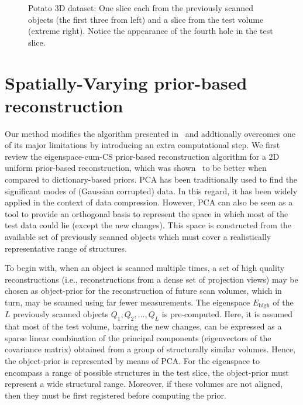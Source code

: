 \documentclass[journal]{IEEEtran}
\begin{document}
\begin{figure}[!h]
\begin{subfigure}[b]{0.235\linewidth}
\captionsetup{labelformat=empty}
\caption{}
\label{fig:potato3D_test}
     \end{subfigure}
      \caption{Potato 3D dataset: One slice each from the previously scanned objects (the first three from left) and a slice from the test 
        volume (extreme right). Notice the appearance of the fourth
        hole in the test slice. }
\label{fig:potato_dataset}
\end{figure}
\section{Spatially-Varying prior-based reconstruction}
\label{sec:method_spatially_varying_prior}
Our method modifies the algorithm presented in~\cite{my_dicta_paper}
and addtionally overcomes one of its major limitations by introducing
an extra computational step. We first review the eigenspace-cum-CS
prior-based reconstruction algorithm for a
2D uniform prior-based reconstruction, which was
shown~\cite{my_dicta_paper} to be better when compared to
dictionary-based priors. PCA has been traditionally used
to find the significant modes of (Gaussian corrupted) data. In this
regard, it has been widely applied in the context of data
compression. However, PCA can also be seen as a tool to provide an
orthogonal basis to represent the space in which most of the test data
could lie (except the new changes). This space is constructed from the
available set of previously scanned objects which must cover a
realistically representative range of structures. %

To begin with,
when an object is scanned multiple times, a set of high quality
reconstructions (i.e., reconstructions from a dense set of
projection views) may be chosen as object-prior for the reconstruction
of future scan volumes, which in turn, may be scanned using far fewer
measurements. The eigenspace $E_{\text{high}}$ of the $L$ previously
scanned objects $Q_1,Q_2,...,Q_L$ is pre-computed. Here, it is assumed
that most of the test volume, barring the new changes, can be
expressed as a sparse linear combination of the principal components
(eigenvectors of the covariance matrix) obtained from a group of
structurally similar volumes. Hence, the object-prior is represented
by means of PCA. For the eigenspace to encompass a range of possible
structures in the test slice, the object-prior must represent a wide
structural range. Moreover, if these volumes are not aligned, then
they must be first registered before computing the prior.
\end{document}
